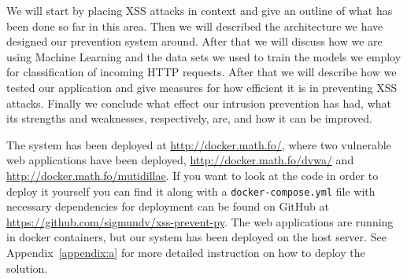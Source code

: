 \documentclass[10pt,journal,compsoc]{IEEEtran}
\begin{document}
We will start by placing XSS attacks in context and give an outline of what has been done so far in this area.
Then we will described the architecture we have designed our prevention system around.
After that we will discuss how we are using Machine Learning and the data sets we used to train the models
we employ for classification of incoming HTTP requests.
After that we will describe how we tested our application and give measures for how efficient it is in preventing XSS
attacks.
Finally we conclude what effect our intrusion prevention has had, what its strengths and weaknesses, respectively, are,
and how it can be improved.

The system has been deployed at \url{http://docker.math.fo/}, where two vulnerable web applications have been deployed,
\url{http://docker.math.fo/dvwa/} and \url{http://docker.math.fo/mutidillae}. If you want to look at the code in order
to deploy it yourself you can find it along with a \verb|docker-compose.yml| file with necessary dependencies
for deployment can be found on GitHub at \url{https://github.com/sigmundv/xss-prevent-py}. The web applications are
running in docker containers, but our system has been deployed on the host server. See Appendix~\ref{appendix:a} for
more detailed instruction on how to deploy the solution.








%
%
\end{document}

